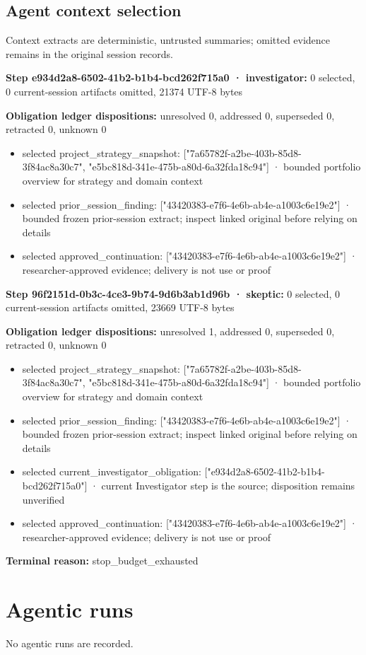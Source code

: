 \documentclass[11pt]{article}
\begin{document}
\subsection{Agent context selection}
Context extracts are deterministic, untrusted summaries; omitted evidence remains in the original session records.\par
\textbf{Step e934d2a8-6502-41b2-b1b4-bcd262f715a0 · investigator:} 0 selected, 0 current-session artifacts omitted, 21374 UTF-8 bytes\par
\textbf{Obligation ledger dispositions:} unresolved 0, addressed 0, superseded 0, retracted 0, unknown 0\par
\begin{itemize}
\item selected project\_strategy\_snapshot: ["7a65782f-a2be-403b-85d8-3f84ac8a30c7", "e5bc818d-341e-475b-a80d-6a32fda18c94"] · bounded portfolio overview for strategy and domain context
\item selected prior\_session\_finding: ["43420383-e7f6-4e6b-ab4e-a1003c6e19e2"] · bounded frozen prior-session extract; inspect linked original before relying on details
\item selected approved\_continuation: ["43420383-e7f6-4e6b-ab4e-a1003c6e19e2"] · researcher-approved evidence; delivery is not use or proof
\end{itemize}
\textbf{Step 96f2151d-0b3c-4ce3-9b74-9d6b3ab1d96b · skeptic:} 0 selected, 0 current-session artifacts omitted, 23669 UTF-8 bytes\par
\textbf{Obligation ledger dispositions:} unresolved 1, addressed 0, superseded 0, retracted 0, unknown 0\par
\begin{itemize}
\item selected project\_strategy\_snapshot: ["7a65782f-a2be-403b-85d8-3f84ac8a30c7", "e5bc818d-341e-475b-a80d-6a32fda18c94"] · bounded portfolio overview for strategy and domain context
\item selected prior\_session\_finding: ["43420383-e7f6-4e6b-ab4e-a1003c6e19e2"] · bounded frozen prior-session extract; inspect linked original before relying on details
\item selected current\_investigator\_obligation: ["e934d2a8-6502-41b2-b1b4-bcd262f715a0"] · current Investigator step is the source; disposition remains unverified
\item selected approved\_continuation: ["43420383-e7f6-4e6b-ab4e-a1003c6e19e2"] · researcher-approved evidence; delivery is not use or proof
\end{itemize}
\textbf{Terminal reason:} stop\_budget\_exhausted\par
\section{Agentic runs}
No agentic runs are recorded.\par
\end{document}

